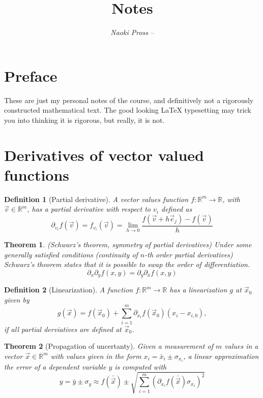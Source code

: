 \documentclass[twocolumn, margin=normal]{tex/hsrzf}
\author{\textsl{Naoki Pross} -- \texttt{\theauthoremail}}
\title{\texttt{\themodule} Notes}
\date{\thesemester}
\theoremstyle{fuvarzf}
\newtheorem{theorem}{Theorem}
\newtheorem{definition}{Definition}
\begin{document}
\maketitle

\section{Preface}

These are just my personal notes of the \themodule{} course, and definitively
not a rigorously constructed mathematical text. The good looking \LaTeX{}
typesetting may trick you into thinking it is rigorous, but really, it is not.

\section{Derivatives of vector valued functions}

\begin{definition}[Partial derivative]
  A vector values function \(f: \mathbb{R}^m\to\mathbb{R}\), with
  \(\vec{v}\in\mathbb{R}^m\), has a partial derivative with respect to \(v_i\)
  defined as
  \[
    \partial_{v_i} f(\vec{v})
      = f_{v_i}(\vec{v})
      = \lim_{h\to 0} \frac{f(\vec{v} + h\vec{e}_j) - f(\vec{v})}{h}
  \]
\end{definition}

\begin{theorem}(Schwarz's theorem, symmetry of partial derivatives)
  Under some generally satisfied conditions (continuity of \(n\)-th order
  partial derivatives) Schwarz's theorem states that it is possible to swap
  the order of differentiation.
  \[
    \partial_x \partial_y f(x,y) = \partial_y \partial_x f(x,y)
  \]
\end{theorem}

\begin{definition}[Linearization]
  A function \(f: \mathbb{R}^m\to\mathbb{R}\) has a linearization \(g\) at
  \(\vec{x}_0\) given by
  \[
    g(\vec{x}) = f(\vec{x}_0) 
      + \sum_{i=1}^m \partial_{x_i} f(\vec{x}_0)(x_i - x_{i,0}) ,
  \]
  if all partial derviatives are defined at \(\vec{x}_0\).
\end{definition}

\begin{theorem}[Propagation of uncertanty]
  Given a measurement of \(m\) values in a vector \(\vec{x}\in\mathbb{R}^m\)
  with values given in the form \(x_i = \bar{x}_i \pm \sigma_{x_i}\), a linear
  approximation the error of a dependent variable \(y\) is computed with
  \[
    y = \bar{y} \pm \sigma_y \approx f(\bar{\vec{x}})
      \pm \sqrt{\sum_{i=1}^m \left(
        \partial_{x_i} f(\bar{\vec{x}}) \sigma_{x_i}\right)^2}
  \]
\end{theorem}
\end{document}
